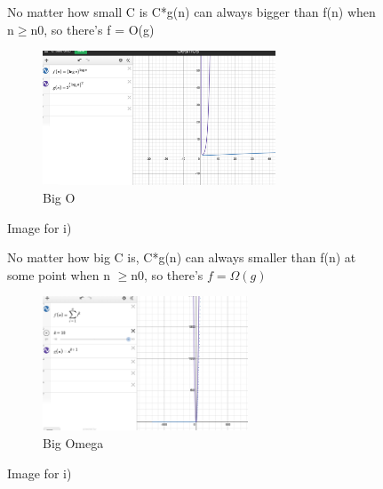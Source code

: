 \documentclass{article}
\begin{document}
\begin{enumerate}[label=(\alph*)]
\begin{figure}[h]
\item %
No matter how small C is C*g(n) can always bigger than f(n) when n$\ge$n0, so there's f = O(g)\\  
    \begin{subfigure}{0.5\textwidth}
    \includegraphics[width=0.9\linewidth, height=4cm]{p big O.png}
    \caption{Big O}
    \label{fig:subim1}
    \end{subfigure}
    \caption{Image for i)}
    \label{fig:image2}
    \end{figure}

\begin{figure}[h]    
\item %
No matter how big C is, C*g(n) can always smaller than f(n) at some point when n $\ge $n0, so there's $f = \Omega(g)$\\   
    \begin{subfigure}{0.5\textwidth}
    \includegraphics[width=0.9\linewidth, height=4cm]{q big Omega.png}
    \caption{Big Omega}
    \label{fig:subim1}
    \end{subfigure}
    \caption{Image for i)}
    \label{fig:image2}
    \end{figure}
\end{enumerate}
\end{document}
